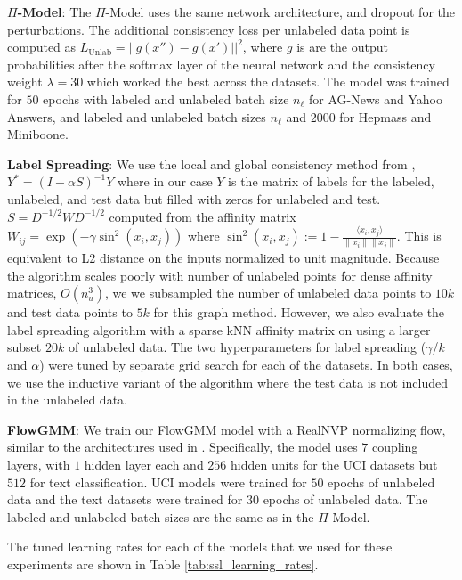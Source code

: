 \documentclass{article}
\newcommand{\method}{FlowGMM\xspace}
\begin{document}
\textbf{$\Pi$-Model}: The $\Pi$-Model uses the same network architecture, and dropout for the perturbations. The additional consistency loss per unlabeled data point is computed as $L_\textrm{Unlab} = ||g(x'')-g(x')||^2$, where $g$ is are the output probabilities after the softmax layer of the neural network and the consistency weight $\lambda = 30$ which worked the best across the datasets. The model was trained for $50$ epochs with labeled and unlabeled batch size $n_\ell$ for AG-News and Yahoo Answers, and labeled and unlabeled batch sizes $n_\ell$ and $2000$ for Hepmass and Miniboone.

\textbf{Label Spreading}: We use the local and global consistency method from \citet{zhou2004learning}, $Y^* = (I-\alpha S)^{-1}Y$ where in our case $Y$ is the matrix of labels for the labeled, unlabeled, and test data but filled with zeros for unlabeled and test. $S = D^{-1/2}WD^{-1/2}$ computed from the affinity matrix $W_{ij} = \exp{(-\gamma \sin^2(x_i,x_j))}$ where $\sin^2(x_i,x_j) := 1 - \frac{\langle x_i,x_j\rangle}{\|x_i\|\|x_j\|}$. This is equivalent to L2 distance on the inputs normalized to unit magnitude. Because the algorithm scales poorly with number of unlabeled points for dense affinity matrices, $O(n_u^3)$, we we subsampled the number of unlabeled data points to $10k$ and test data points to $5k$ for this graph method. However, we also evaluate the label spreading algorithm with a sparse kNN affinity matrix on using a larger subset $20k$ of unlabeled data. The two hyperparameters for label spreading ($\gamma$/$k$ and $\alpha$) were tuned by separate grid search for each of the datasets. In both cases, we use the inductive variant of the algorithm where the test data is not included in the unlabeled data. 

\textbf{\method}:
We train our \method model with a RealNVP normalizing flow, similar to the architectures used in \citet{papamakarios2017masked}. Specifically, the model uses $7$ coupling layers, with $1$ hidden layer each and $256$ hidden units for the UCI datasets but $512$ for text classification. UCI models were trained for $50$ epochs of unlabeled data and the text datasets were trained for $30$ epochs of unlabeled data. The labeled and unlabeled batch sizes are the same as in the $\Pi$-Model.

The tuned learning rates for each of the models that we used for these experiments are shown in Table \ref{tab:ssl_learning_rates}.
\end{document}
